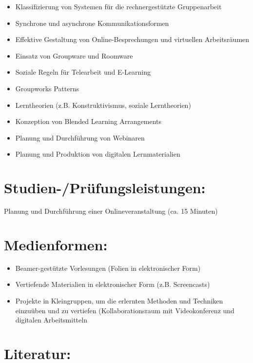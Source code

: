 \begin{itemize}
\tightlist
\item
  Klassifizierung von Systemen für die rechnergestützte Gruppenarbeit
\item
  Synchrone und asynchrone Kommunikationsformen
\item
  Effektive Gestaltung von Online-Besprechungen und virtuellen
  Arbeitsräumen
\item
  Einsatz von Groupware und Roomware
\item
  Soziale Regeln für Telearbeit und E-Learning
\item
  Groupworks Patterns
\item
  Lerntheorien (z.B. Konstruktivismus, soziale Lerntheorien)
\item
  Konzeption von Blended Learning Arrangements
\item
  Planung und Durchführung von Webinaren
\item
  Planung und Produktion von digitalen Lernmaterialien
\end{itemize}

\section*{Studien-/Prüfungsleistungen:}\label{studien-pruxfcfungsleistungen-13}

Planung und Durchführung einer Onlineveranstaltung (ca. 15 Minuten)

\section*{Medienformen:}\label{medienformen-13}

\begin{itemize}
\tightlist
\item
  Beamer-gestützte Vorlesungen (Folien in elektronischer Form)
\item
  Vertiefende Materialien in elektronischer Form (z.B. Screencasts)
\item
  Projekte in Kleingruppen, um die erlernten Methoden und Techniken
  einzuüben und zu vertiefen (Kollaborationsraum mit Videokonferenz und
  digitalen Arbeitsmitteln
\end{itemize}

\section*{Literatur:}\label{literatur-10}

